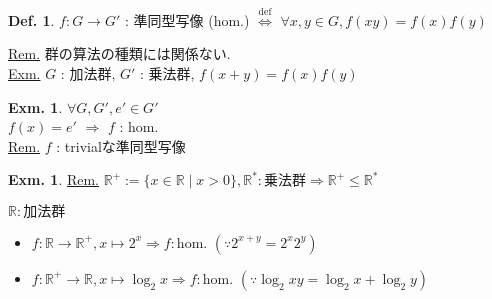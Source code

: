\documentclass[uplatex,dvipdfmx,9pt]{beamer}
\newcommand{\defarrow}{\overset{\mathrm{def}}{\Leftrightarrow}}
\newcounter{textExmCount}
\theoremstyle{definition} %
\newtheorem{defn}{Def.}[subsection] %
\theoremstyle{example}
\newtheorem{exmText}[textExmCount]{Exm.}
\begin{document}
      \begin{frame}
        
        \begin{defn}
          $f\colon G \to G'$ : \alert{準同型写像} (hom.) $\defarrow$ $\forall x,y \in G, f(xy) = f(x)f(y)$
        \end{defn}
        \underline{Rem.} 群の算法の種類には関係ない. \\
        \underline{Exm.} $G$ : 加法群, $G'$ : 乗法群, $f(x + y) = f(x)f(y)$

        \begin{exmText}
          $\forall G,G', e' \in G'$ \\
          $f(x) = e'$ $\Rightarrow $ $f$ : hom. \\
          \underline{Rem.} $f$ : trivialな準同型写像
        \end{exmText}

        \begin{exmText}

          \underline{Rem.}  $\mathbb{R}^+ := \{x \in \mathbb{R} \mid x > 0\}, \mathbb{R}^* : \text{乗法群} \Rightarrow \mathbb{R}^+ \le \mathbb{R}^* $ 

          $\mathbb{R}: \text{加法群}$ \\
          \begin{itemize}
            \item $f\colon \mathbb{R} \to \mathbb{R}^+, x \mapsto 2^{x} \Rightarrow f : \text{hom.}$
              $(\because 2^{x+y} = 2^x2^y)$
            \item $f\colon \mathbb{R}^+ \to \mathbb{R}, x \mapsto \log_2 x \Rightarrow f : \text{hom.}$
              $(\because \log_2 xy = \log_2 x + \log_2 y)$
          \end{itemize}

        \end{exmText}

      \end{frame}
\end{document}
